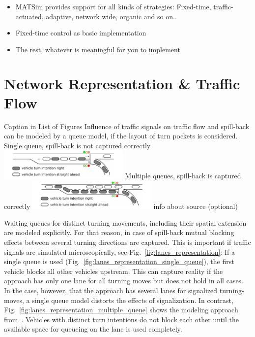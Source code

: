 \begin{itemize}
	\item MATSim provides support for all kinds of strategies: Fixed-time, traffic-actuated, adaptive, network wide, organic and so on..
	\item Fixed-time control as basic implementation
	\item The rest, whatever is meaningful for you to implement
\end{itemize}

\section{Network Representation \& Traffic Flow}
\label{sec:signals_network_traffic_flow}

\createfigure%
{Caption in List of Figures}%
{Influence of traffic signals on traffic flow and spill-back can be modeled by a queue model, if the layout of turn pockets is considered.}
{\label{fig:lanes_representation}}%
{%
  \createsubfigure%
	{Single queue, spill-back is not captured correctly}%
	{\includegraphics[width=0.48\textwidth]{extending/figures/signalslanes/single_queue_model_inkscape.pdf}}%
	{\label{fig:lanes_representation_single_queue}}%
  \createsubfigure%
	{Multiple queues, spill-back is captured correctly}%
	{\includegraphics[width=0.48\textwidth]{extending/figures/signalslanes/multiple_queue_model_inkscape.pdf}}%
	{\label{fig:lanes_representation_multiple_queue}}%
}%
{info about source (optional)}

Waiting queues for distinct turning movements, including their spatial extension are modeled explicitly. 
For that reason, in case of spill-back mutual blocking effects between several turning directions are captured.
This is important if traffic signals are simulated microscopically, see Fig.~\ref{fig:lanes_representation}: If a single queue is used (Fig.~\ref{fig:lanes_representation_single_queue}), the first vehicle blocks all other vehicles upstream. 
This can capture reality if the approach has only one lane for all turning moves but does not hold in all cases. 
In the case, however, that the approach has several lanes for signalized turning-moves, a single queue model distorts the effects of signalization. 
In contrast, Fig.~\ref{fig:lanes_representation_multiple_queue} shows the modeling approach from~\cite{CremerLandenfeld1998MesoTrafficSignalModel}. Vehicles with distinct turn intentions do not block each other until the available space for queueing on the lane is used completely.


